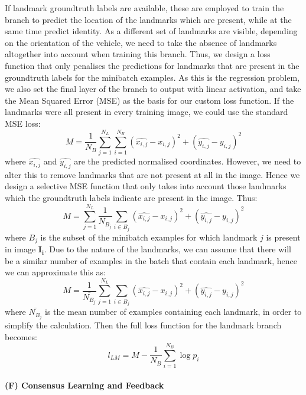 \documentclass[10pt,twocolumn,letterpaper]{article}
\begin{document}
If landmark groundtruth labels are available, these are employed to train the branch to predict the location of the landmarks which are present, while at the same time predict identity. As a different set of landmarks are visible, depending on the orientation of the vehicle, we need to take the absence of landmarks altogether into account when training this branch. Thus, we design a loss function that only penalises the predictions for landmarks that are present in the groundtruth labels for the minibatch examples. As this is the regression problem, we also set the final layer of the branch to output with linear activation, and take the Mean Squared Error (MSE) as the basis for our custom loss function. If the landmarks were all present in every training image, we could use the standard MSE loss:
\begin{equation}
  M = \frac{1}{N_B} \sum_{j=1}^{N_L} \sum_{i=1}^{N_B} (\hat{x_{i,j}} - x_{i,j})^2 + (\hat{y_{i,j}} - y_{i,j})^2
\end{equation}
where $\hat{x_{i,j}}$ and $\hat{y_{i,j}}$ are the predicted normalised coordinates. However, we need to alter this to remove landmarks that are not present at all in the image. Hence we design a selective MSE function that only takes into account those landmarks which the groundtruth labels indicate are present in the image. Thus:
\begin{equation}
  M = \sum_{j=1}^{N_L} \frac{1}{N_{B_j}} \sum_{i \in B_j} (\hat{x_{i,j}} - x_{i,j})^2 + (\hat{y_{i,j}} - y_{i,j})^2
\end{equation}
where $B_j$ is the subset of the minibatch examples for which landmark $j$ is present in image $\mathbf{I_i}$. Due to the nature of the landmarks, we can assume that there will be a similar number of examples in the batch that contain each landmark, hence we can approximate this as:
\begin{equation}
  M = \frac{1}{\bar{N_{B_j}}} \sum_{j=1}^{N_L}  \sum_{i \in B_j} (\hat{x_{i,j}} - x_{i,j})^2 + (\hat{y_{i,j}} - y_{i,j})^2
\end{equation}
where $\bar{N_{B_j}}$ is the mean number of examples containing each landmark, in order to simplify the calculation. Then the full loss function for the landmark branch becomes:
\begin{equation}
  l_{LM} = M - \frac{1}{N_B} \sum_{i=1}^{N_B} \log{p_i}
\end{equation}

\paragraph{(F) Consensus Learning and Feedback}
\end{document}
